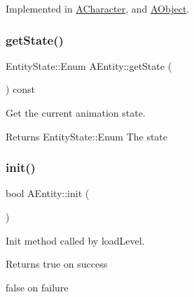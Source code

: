 Implemented in \hyperlink{class_a_character_a41875fc55beaafd65fbe53ea3abc7f98}{A\+Character}, and \hyperlink{class_a_object_ab5840de6100bba8bf93a186a0a802708}{A\+Object}.

\mbox{\label{class_a_entity_a135cbfb08a2204ff396de4de2d645b5f}} 
\subsubsection{\texorpdfstring{get\+State()}{getState()}}
{\footnotesize\ttfamily Entity\+State\+::\+Enum A\+Entity\+::get\+State (\begin{DoxyParamCaption}{ }\end{DoxyParamCaption}) const}



Get the current animation state. 

\begin{DoxyReturn}{Returns}
Entity\+State\+::\+Enum The state 
\end{DoxyReturn}
\mbox{\label{class_a_entity_a450361b684fa02e4ffe0ba406b8e3b30}} 
\subsubsection{\texorpdfstring{init()}{init()}}
{\footnotesize\ttfamily bool A\+Entity\+::init (\begin{DoxyParamCaption}{ }\end{DoxyParamCaption})\hspace{0.3cm}{\ttfamily [virtual]}}



Init method called by load\+Level. 

\begin{DoxyReturn}{Returns}
true on success 

false on failure 
\end{DoxyReturn}



